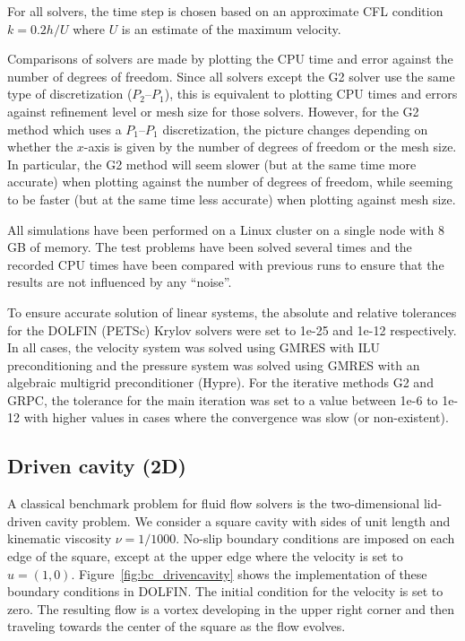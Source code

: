 For all solvers, the time step is chosen based on an approximate CFL
condition $k = 0.2 h / U$ where $U$ is an estimate of the maximum
velocity.

Comparisons of solvers are made by plotting the CPU time and error
against the number of degrees of freedom. Since all solvers except the
G2 solver use the same type of discretization ($P_2$--$P_1$), this is
equivalent to plotting CPU times and errors against refinement level
or mesh size for those solvers. However, for the G2 method which uses
a $P_1$--$P_1$ discretization, the picture changes depending on
whether the $x$-axis is given by the number of degrees of freedom or
the mesh size. In particular, the G2 method will seem slower (but at
the same time more accurate) when plotting against the number of
degrees of freedom, while seeming to be faster (but at the same time
less accurate) when plotting against mesh size.

All simulations have been performed on a Linux cluster on a single
node with 8 GB of memory. The test problems have been solved several
times and the recorded CPU times have been compared with previous runs
to ensure that the results are not influenced by any ``noise''.

To ensure accurate solution of linear systems, the absolute and
relative tolerances for the DOLFIN (PETSc) Krylov solvers were set to
1e-25 and 1e-12 respectively. In all cases, the velocity system was
solved using GMRES with ILU preconditioning and the pressure system
was solved using GMRES with an algebraic multigrid preconditioner
(Hypre). For the iterative methods G2 and GRPC, the tolerance for the
main iteration was set to a value between 1e-6 to 1e-12 with higher
values in cases where the convergence was slow (or non-existent).

\subsection{Driven cavity (2D)}

A classical benchmark problem for fluid flow solvers is the
two-dimensional lid-driven cavity problem. We consider a square cavity
with sides of unit length and kinematic viscosity $\nu =
1/1000$. No-slip boundary conditions are imposed on each edge of the
square, except at the upper edge where the velocity is set to $u = (1,
0)$. Figure~\ref{fig:bc_drivencavity} shows the implementation of
these boundary conditions in DOLFIN. The initial condition for the
velocity is set to zero. The resulting flow is a vortex developing in
the upper right corner and then traveling towards the center of the
square as the flow evolves.

